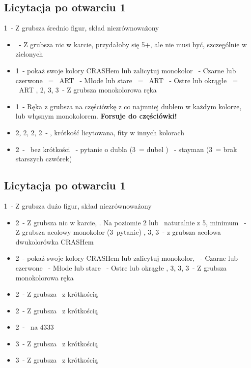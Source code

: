 \documentclass[12pt, a4paper]{article}
\begin{document}
\pagebreak
\subsection{Licytacja po otwarciu 1\hearts}
\begin{formal}
    1\hearts\ - Z grubsza średnio figur, skład niezrównoważony
\end{formal}
\begin{itemize}
    \item \pass\ - Z grubsza nic w karcie, przydałoby się 5+\hearts, ale nie musi być, szczególnie w zielonych
    \item 1\spades\ - pokaż swoje kolory CRASHem lub zalicytuj monokolor
    \nt\ - Czarne lub czerwone \spades\ = \gf\ ART
    \clubs\ - Młode lub stare \spades\ = \gf\ ART
    \diams\ - Ostre lub okrągłe \spades\ = \gf\ ART
    \hearts, 2\spades, 3\clubs, 3\diams\ - Z grubsza monokolorowa ręka
    \item 1\nt\ - Ręka z grubsza na częściówkę z co najmniej dublem w każdym kolorze, lub włąsnym monokolorem. \textbf{Forsuje do częściówki!}
    \item 2\clubs, 2\diams, 2\hearts, 2\spades\ - \gf, krótkość licytowana, fity w innych kolorach
    \item 2\nt\ - \gf\ bez krótkości
    \clubs\ - pytanie o dubla (3\nt\ = dubel \clubs)
    \diams\ - stayman (3\nt\ = brak starszych czwórek)
\end{itemize}

\pagebreak
\subsection{Licytacja po otwarciu 1\ntx}
\begin{formal}
    1\nt\ - Z grubsza dużo figur, skład niezrównoważony
\end{formal}
\begin{itemize}
    \item 2\clubs\ - Z grubsza nic w karcie, \nf.
    \subitem Na poziomie 2 lub \pass\ naturalnie z 5, minimum
    \nt\ - Z grubsza acolowy monokolor (3\clubs\ pytanie)
    \clubs, 3\diams, 3\hearts\ - z grubsza acolowa dwukolorówka CRASHem
    \item 2\diams\ - pokaż swoje kolory CRASHem lub zalicytuj monokolor, \gf
    \hearts\ - Czarne lub czerwone
    \spades\ - Młode lub stare
    \nt\ - Ostre lub okrągłe
    \clubs, 3\diams, 3\hearts, 3\spades\ - Z grubsza monokolorowa ręka
    \item 2\hearts\ - Z grubsza \gf\ z krótkością \hearts
    \item 2\spades\ - Z grubsza \gf\ z krótkością \spades
    \item 2\nt\ - \gf\ na 4333
    \item 3\clubs\ - Z grubsza \gf\ z krótkością \clubs
    \item 3\diams\ - Z grubsza \gf\ z krótkością \diams 
\end{itemize}
\end{document}

